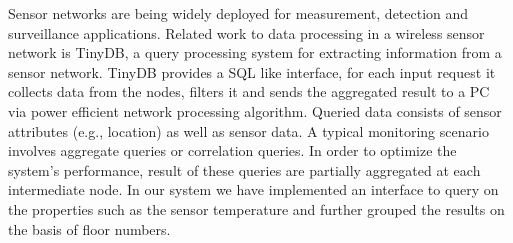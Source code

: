 Sensor networks are being widely deployed for measurement, detection and surveillance applications.  Related work to data processing in a wireless sensor network is TinyDB, a query processing system for extracting information from a sensor network. TinyDB provides a SQL like interface, for each input request it collects data from the nodes, filters it and sends the aggregated result to a PC via power efficient network processing algorithm. Queried data consists of sensor attributes (e.g., location) as well as sensor data. A typical monitoring scenario involves aggregate queries or correlation queries. In order to optimize the system's  performance, result of these queries are partially aggregated at each intermediate node. In our system we have implemented an interface to query on the properties such as the sensor temperature and further grouped the results on the basis of floor numbers.

